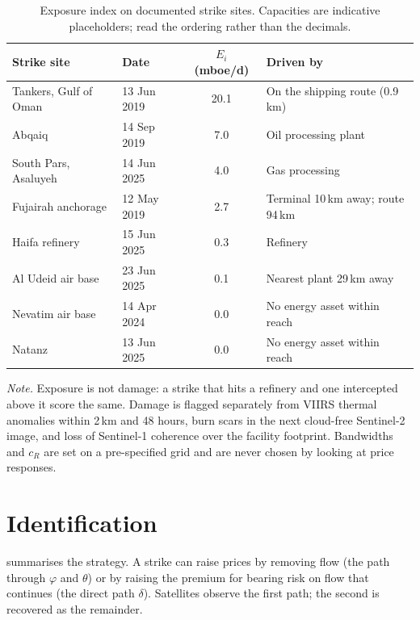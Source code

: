 \documentclass{article}
\begin{document}
\begin{table}[!htb]
\centering
\small
\begin{threeparttable}
\caption{Exposure index on documented strike sites. Capacities are indicative placeholders; read the ordering rather than the decimals.}
\label{tab:exposure}
\begin{tabularx}{\textwidth}{@{}L{4.3cm}lS[table-format=2.1]Y@{}}
\toprule
Strike site & Date & {$E_i$ (mboe/d)} & Driven by \\
\midrule
Tankers, Gulf of Oman & 13 Jun 2019 & 20.1 & On the shipping route (0.9\,km) \\
 Abqaiq & 14 Sep 2019 & 7.0 & Oil processing plant \\
South Pars, Asaluyeh & 14 Jun 2025 & 4.0 & Gas processing \\
 Fujairah anchorage & 12 May 2019 & 2.7 & Terminal 10\,km away; route 94\,km \\
Haifa refinery & 15 Jun 2025 & 0.3 & Refinery \\
 Al Udeid air base & 23 Jun 2025 & 0.1 & Nearest plant 29\,km away \\
Nevatim air base & 14 Apr 2024 & 0.0 & No energy asset within reach \\
 Natanz & 13 Jun 2025 & 0.0 & No energy asset within reach \\
\bottomrule
\end{tabularx}
\begin{tablenotes}\footnotesize
\item \emph{Note.} Exposure is not damage: a strike that hits a refinery and one intercepted above it score the same. Damage is flagged separately from VIIRS thermal anomalies within 2\,km and 48 hours, burn scars in the next cloud-free Sentinel-2 image, and loss of Sentinel-1 coherence over the facility footprint. Bandwidths and $c_R$ are set on a pre-specified grid and are never chosen by looking at price responses.
\end{tablenotes}
\end{threeparttable}
\end{table}

\FloatBarrier
\section{Identification}
\label{sec:ident}

 summarises the strategy. A strike can raise prices by removing flow (the path through $\varphi$ and $\theta$) or by raising the premium for bearing risk on flow that continues (the direct path $\delta$). Satellites observe the first path; the second is recovered as the remainder.
\end{document}
